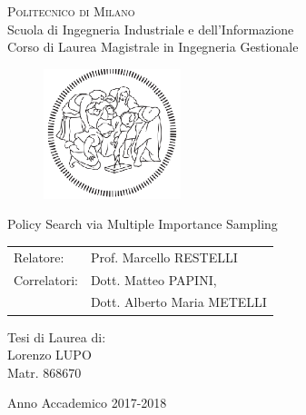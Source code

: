 \begin{titlepage}

	\begin{center}
		\normalsize
			\textsc{Politecnico di Milano}\\
			Scuola di Ingegneria Industriale e dell'Informazione\\
      		Corso di Laurea Magistrale in Ingegneria Gestionale\\
	\end{center}
	\vspace{.6cm}

	\begin{figure}[htpb]
		\centering
		\includegraphics[width=4cm]{Cover/polimi}
	\end{figure}
	\vspace{.6cm}

	\begin{center}
		\LARGE
			Policy Search via Multiple Importance Sampling
	\end{center}
	\vspace{1.6cm}

	\begin{flushleft}
		\large
		\begin{tabular}{ll}
		Relatore:    & Prof. Marcello RESTELLI      \\
		Correlatori: & Dott. Matteo PAPINI, \\
					 & Dott. Alberto Maria METELLI
		\end{tabular}
		\vspace{1cm}
	\end{flushleft}

	\begin{flushright}
		\large
		Tesi di Laurea di:\\
		Lorenzo LUPO\\
		Matr. 868670\\
	\end{flushright}

	\vspace*{\fill}
	\begin{center}
		Anno Accademico 2017-2018
	\end{center}

\end{titlepage}
